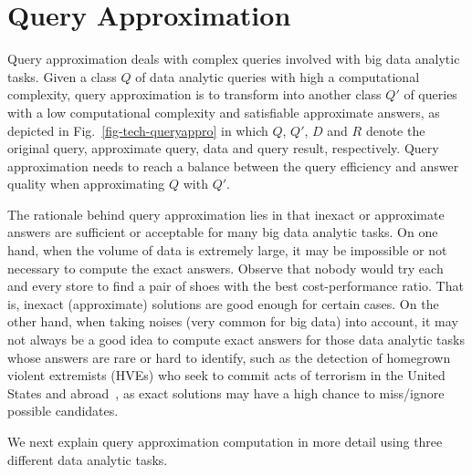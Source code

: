 \section{Query Approximation}
\label{sec-query}


Query approximation deals with complex queries involved with big data analytic tasks. Given a class $Q$ of data analytic queries with high a computational complexity,  query approximation is to transform into another class $Q'$ of queries with a low computational complexity and satisfiable approximate answers, as depicted in Fig.~\ref{fig-tech-queryappro} in which $Q$, $Q'$,  $D$ and $R$ denote the original query, approximate query, data and query result, respectively. Query approximation needs to reach a balance between the query efficiency and answer quality when approximating $Q$ with $Q'$.

The rationale behind query approximation lies in that inexact or approximate answers are sufficient or acceptable for many big data analytic tasks.
On one hand, when the volume of data is extremely large, it may be impossible or not necessary to compute the exact answers.
Observe that nobody would try each and every store to find a pair of shoes with the best cost-performance ratio.
That is, inexact (approximate) solutions are good enough for certain cases.
%
On the other hand, when taking noises (very common for big data) into account, it may not always be a good idea to compute exact answers
for those data analytic tasks whose answers are rare or hard to identify, such as the detection of homegrown violent extremists (HVEs) who seek to commit acts of terrorism in the United States and abroad~\cite{HungJ16}, as exact solutions may have a high chance to miss/ignore possible candidates.

We next explain query approximation computation in more detail using three different data analytic tasks.



